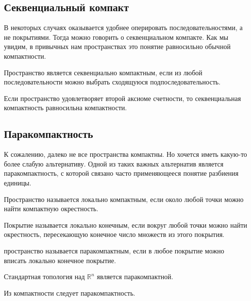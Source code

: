 \subsection{Секвенциальный компакт}
В некоторых случаях оказывается удобнее оперировать последовательностями, а не покрытиями. Тогда можно говорить о секвенциальном компакте. Как мы увидим, в привычных нам пространствах это понятие равносильно обычной компактности.
\begin{Def}
    Пространство \topX является секвенциально компактным, если из любой последовательности можно выбрать сходящуюся подпоследовательность.
\end{Def}
\begin{Th}
    Если пространство удовлетворяет второй аксиоме счетности, то секвенциальная компактность равносильна компактности.
\end{Th}

\subsection{Паракомпактность}
К сожалению, далеко не все пространства компактны. Но хочется иметь какую-то более слабую альтернативу. Одной из таких важных альтернатив является паракомпактность, с которой связано часто применяющееся понятие разбиения единицы.
\begin{Def}
    Пространство \topX называется локально компактным, если около любой точки можно найти компактную окрестность.
\end{Def}
\begin{Def}
    Покрытие называется локально конечным, если вокруг любой точки можно найти окрестность, пересекающую конечное число множеств из этого покрытия.
\end{Def}

\begin{Def}
    пространство \topX называется паракомпактным, если в любое покрытие можно вписать локально конечное покрытие.
\end{Def}

\begin{Ex}
    Стандартная топология над $\mathbb{R}^n$ является паракомпактной.
\end{Ex}

\begin{Prop}
    Из компактности следует паракомпактность.
\end{Prop}

